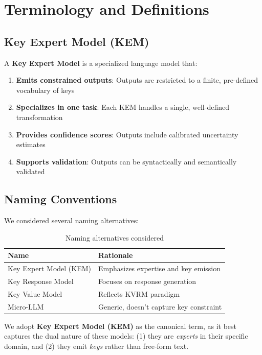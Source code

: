 \documentclass[11pt]{article}
\begin{document}
\section{Terminology and Definitions}

\subsection{Key Expert Model (KEM)}

A \textbf{Key Expert Model} is a specialized language model that:

\begin{enumerate}
    \item \textbf{Emits constrained outputs}: Outputs are restricted to a finite, pre-defined vocabulary of keys
    \item \textbf{Specializes in one task}: Each KEM handles a single, well-defined transformation
    \item \textbf{Provides confidence scores}: Outputs include calibrated uncertainty estimates
    \item \textbf{Supports validation}: Outputs can be syntactically and semantically validated
\end{enumerate}

\subsection{Naming Conventions}

We considered several naming alternatives:

\begin{table}[h]
\centering
\begin{tabular}{ll}
\toprule
\textbf{Name} & \textbf{Rationale} \\
\midrule
Key Expert Model (KEM) & Emphasizes expertise and key emission \\
Key Response Model & Focuses on response generation \\
Key Value Model & Reflects KVRM paradigm \\
Micro-LLM & Generic, doesn't capture key constraint \\
\bottomrule
\end{tabular}
\caption{Naming alternatives considered}
\end{table}

We adopt \textbf{Key Expert Model (KEM)} as the canonical term, as it best captures the dual nature of these models: (1) they are \emph{experts} in their specific domain, and (2) they emit \emph{keys} rather than free-form text.
\end{document}
